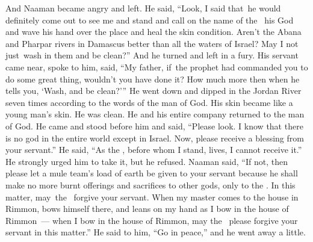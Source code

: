 \begin{inparaenum}
   And Naaman became angry and left. He said, ``Look, I said that\understood\ he would definitely come out to see me and stand and call on the name of the \lord\ his God and wave his hand over the place and heal the skin condition.%
   Aren't the Abana and Pharpar rivers in Damascus better than all the waters of Israel? May I not just\understood\ wash in them and be clean?'' And he turned and left in a fury.%
   His servant came near, spoke to him, said, ``My father, if\understood\ the prophet had commanded you to do some great thing, wouldn't you have done it? How much more then when he tells you, `Wash, and be clean?'\thinspace''%
   He went down and dipped in the Jordan River seven times according to the words of the man of God. His skin became like a young man's skin. He was clean.%
   He and his entire company returned to the man of God. He came and stood before him and said, ``Please look. I know that there is no god in the entire world except in Israel. Now, please receive a blessing from your servant.''%
   He said, ``As the \lord, before whom I stand, lives, I cannot receive it.'' He strongly urged him to take it, but he refused.%
   Naaman said, ``If not, then please let a mule team's load of earth be given to your servant because he shall make no more burnt offerings and sacrifices to other gods, only to the \lord.%
   In this matter, may\understood\ the \lord\ forgive your servant. When my master comes to the house in Rimmon, bows himself there, and leans on my hand as I bow in the house of Rimmon~--- when I bow in the house of Rimmon, may the \lord\ please forgive your servant in this matter.''%
   He said to him, ``Go in peace,'' and he went away a little.%
  

\end{inparaenum}
